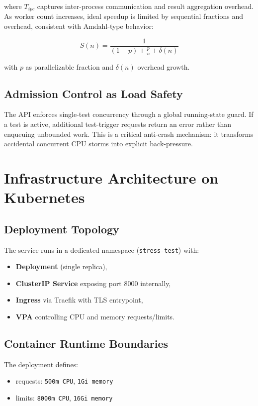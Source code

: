 \documentclass[11pt,a4paper]{article}
\begin{document}
where $T_{ipc}$ captures inter-process communication and result aggregation overhead. As worker count increases, ideal speedup is limited by sequential fractions and overhead, consistent with Amdahl-type behavior:

\[
S(n) = \frac{1}{(1-p) + \frac{p}{n} + \delta(n)}
\]

with $p$ as parallelizable fraction and $\delta(n)$ overhead growth.

\subsection{Admission Control as Load Safety}
The API enforces single-test concurrency through a global running-state guard. If a test is active, additional test-trigger requests return an error rather than enqueuing unbounded work. This is a critical anti-crash mechanism: it transforms accidental concurrent CPU storms into explicit back-pressure.

\section{Infrastructure Architecture on Kubernetes}

\subsection{Deployment Topology}
The service runs in a dedicated namespace (\texttt{stress-test}) with:

\begin{itemize}[leftmargin=1.5em]
	\item \textbf{Deployment} (single replica),
	\item \textbf{ClusterIP Service} exposing port 8000 internally,
	\item \textbf{Ingress} via Traefik with TLS entrypoint,
	\item \textbf{VPA} controlling CPU and memory requests/limits.
\end{itemize}

\subsection{Container Runtime Boundaries}
The deployment defines:

\begin{itemize}[leftmargin=1.5em]
	\item requests: \texttt{500m CPU}, \texttt{1Gi memory}
	\item limits: \texttt{8000m CPU}, \texttt{16Gi memory}
\end{itemize}
\end{document}
